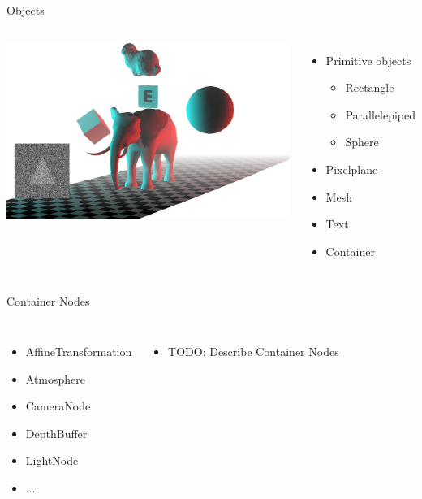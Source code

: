 \documentclass[12pt,ucs,hyperref={pdftext}]{beamer}
\newlength{\columnleft}
\newlength{\columnright}
\begin{document}
\begin{frame}{Objects}
\begin{columns}

\column{\columnleft}

\includegraphics[width=\columnleft]{media/title.png}

\column{\columnright}
\begin{itemize}%
\item Primitive objects
\begin{itemize}
\item Rectangle
\item Parallelepiped
\item Sphere
\end{itemize}
\item Pixelplane
\item Mesh
\item Text
\item Container
\end{itemize}

\end{columns}
\end{frame}

\begin{frame}{Container Nodes}
\begin{columns}

\column{\columnleft}
\begin{itemize}
\item AffineTransformation
\item Atmosphere
\item CameraNode
\item DepthBuffer
\item LightNode
\item ...
\end{itemize}

\column{\columnright}
\begin{itemize}%
\item TODO: Describe Container Nodes
\end{itemize}

\end{columns}
\end{frame}
\end{document}

